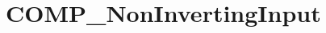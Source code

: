 \hypertarget{group___c_o_m_p___non_inverting_input}{\section{C\-O\-M\-P\-\_\-\-Non\-Inverting\-Input}
\label{group___c_o_m_p___non_inverting_input}
}
